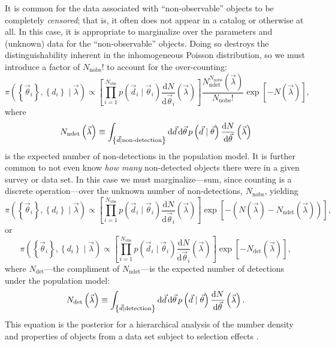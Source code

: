 \documentclass[modern]{aastex62}
\newcommand{\dd}{\mathrm{d}}
\newcommand{\diff}[2]{\frac{\dd #1}{\dd #2}}
\newcommand{\Ndet}{N_\mathrm{det}}
\newcommand{\Nndet}{N_\mathrm{ndet}}
\newcommand{\Nnobs}{N_\mathrm{nobs}}
\newcommand{\Nobs}{N_\mathrm{obs}}
\newcommand{\vd}{\vec{d}}
\newcommand{\vlambda}{\vec{\lambda}}
\newcommand{\vtheta}{\vec{\theta}}
\begin{document}
It is common for the data associated with ``non-observable'' objects to be
completely \emph{censored}; that is, it often does not appear in a catalog or
otherwise at all.  In this case, it is appropriate to marginalize over the
parameters and (unknown) data for the ``non-observable'' objects.  Doing so
destroys the distinguishability inherent in the inhomogeneous Poisson
distribution, so we must introduce a factor of $\Nnobs!$ to account for the
over-counting:
%
\begin{equation}
  \pi\left(\left\{ \vtheta_i \right\}, \left\{ d_i \right\} \mid \vlambda \right) \propto \left[ \prod_{i=1}^{\Nobs} p\left( \vd_i \mid \vtheta_i \right) \diff{N}{\vtheta_i}\left( \vlambda \right) \right] \frac{\Nndet^{\Nnobs}\left( \vlambda \right)}{\Nnobs!} \exp\left[ - N\left( \vlambda \right) \right],
\end{equation}
%
where
%
\begin{equation}
\Nndet\left( \vlambda \right) \equiv \int_{\left\{ \vd \mid \textnormal{non-detection} \right\}} \dd \vd \, \dd \vtheta \, p\left( \vd \mid \vtheta \right) \diff{N}{\vtheta}\left( \vlambda \right)
\end{equation}
%
is the expected number of non-detections in the population model.  It is further
common to not even know \emph{how many} non-detected objects there were in a
given survey or data set.  In this case we must marginalize---sum, since
counting is a discrete operation---over the unknown number of non-detections,
$\Nnobs$, yielding
%
\begin{equation}
\pi\left(\left\{ \vtheta_i \right\}, \left\{ d_i \right\} \mid \vlambda \right) \propto \left[ \prod_{i=1}^{\Nobs} p\left( \vd_i \mid \vtheta_i \right) \diff{N}{\vtheta_i}\left( \vlambda \right) \right] \exp\left[ - \left( N\left( \vlambda \right) - \Nndet\left( \vlambda \right) \right) \right],
\end{equation}
%
or
%
\begin{equation}
  \pi\left(\left\{ \vtheta_i \right\}, \left\{ d_i \right\} \mid \vlambda \right) \propto \left[ \prod_{i=1}^{\Nobs} p\left( \vd_i \mid \vtheta_i \right) \diff{N}{\vtheta_i}\left( \vlambda \right) \right] \exp\left[ - \Ndet\left( \vlambda \right) \right],
\end{equation}
%
where $\Ndet$---the compliment of $\Nndet$---is the expected number of
detections under the population model:
%
\begin{equation}
  \Ndet\left( \vlambda \right) \equiv \int_{\left\{ \vd \mid \textnormal{detection} \right\}} \dd \vd \, \dd \vtheta \, p\left( \vd \mid \vtheta \right) \diff{N}{\vtheta}\left( \vlambda \right).
\end{equation}
%
This equation is the posterior for a hierarchical analysis of the number density
and properties of objects from a data set subject to selection effects
\citep[e.g.][]{Gair2010,Youdin2011,Fishbach2018,Wysocki2018}.
\end{document}
